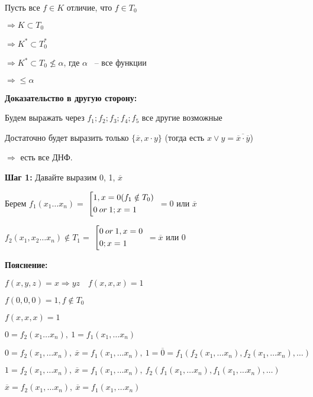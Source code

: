 \documentclass[russian]{lecture-notes}
\begin{document}
	Пусть все $f \in K$ отличие, что
	$f \in T_0$

	$ \Rightarrow K \subset T_0$ 

	$\Rightarrow K^* \subset T^*_0$ 

	$\Rightarrow K^* \subset T_0 \nleq \alpha$, где $\alpha$ ~-- все функции
	
	$\Rightarrow \leq \alpha$

	\textbf{Доказательство в другую сторону:}
	
	Будем выражать через $f_1; f_2; f_3; f_4; f_5$ все другие возможные
	
	Достаточно будет выразить только $\{ \overline{x}, x \cdot y\}$ (тогда есть $x \lor y = \overline{\overline{x} \cdot \overline{y}}$)
	
	$\Rightarrow$ есть все ДНФ.
	
	\textbf{Шаг 1:}
	Давайте выразим 0, 1, $\overline{x}$
	
	Берем $f_1(x_1 \dots x_n) = $
	$\left[ 
  		\begin{gathered} 
    			1, x = 0 (f_1 \notin T_0) \hfill 
        \\ 
        		0 \: or \: 1; x = 1 \hfill 
        \\ 
	  	\end{gathered} 
	\right.$
	$ = 0$ или $\overline{x}$
	
	$f_2(x_1, x_2 \dots x_n) \notin T_1 = $
	$\left[ 
  		\begin{gathered} 
    			0 \: or \: 1, x = 0 \hfill 
        \\ 
        		0; x = 1 \hfill 
        \\ 
	  	\end{gathered} 
	\right.$
	$ = \overline{x}$ или $0$
	
	\textbf{Пояснение:}
	
	$f(x, y, z) = x \Rightarrow yz \quad f(x, x, x) = 1$
	
	$f(0, 0, 0) = 1, f \notin T_0$
	
	$f(x, x, x) = 1$
	
	$0 = f_2(x_1 \dots x_n), \: 1 = 	f_1(x_1, \dots x_n)$
	
	$0 = f_2(x_1, \dots x_n), \: \overline{x} = f_1(x_1, \dots x_n), \: 1 = \overline{0} = f_1(f_2(x_1, \dots x_n), f_2(x_1, \dots x_n), \dots) $
	
	$1 = f_2(x_1, \dots x_n), \: \overline{x} = f_1(x_1, \dots x_n), \: f_2(f_1(x_1, \dots x_n), f_1(x_1, \dots x_n), \dots)$
	
	$\overline{x} = f_2(x_1, \dots x_n), \: \overline{x} = f_1(x_1, \dots x_n)$
	
\end{document}
